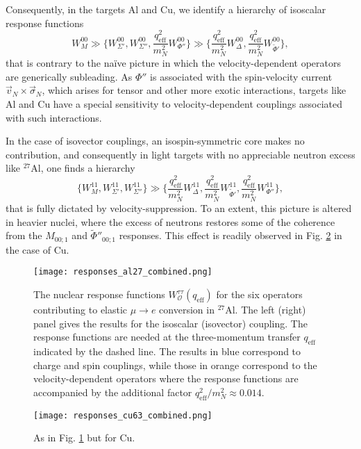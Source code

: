 \documentclass{book}[letterpaper,12pt]
\begin{document}
Consequently, in the targets Al and Cu, we identify a hierarchy of isoscalar response functions
\begin{equation}
W_M^{00}\gg \bigg\{W^{00}_{\Sigma'},W_{\Sigma''}^{00},\frac{q_\mathrm{eff}^2}{m_N^2}W^{00}_{\Phi''}\bigg\}\gg\bigg\{\frac{q_\mathrm{eff}^2}{m_N^2}W^{00}_{\Delta},\frac{q^2_\mathrm{eff}}{m_N^2}W_{\tilde{\Phi}'}^{00}\bigg\},
\end{equation}
that is contrary to the na\"ive picture in which the velocity-dependent operators are generically subleading. As $\Phi''$ is associated with the spin-velocity current $\vec{v}_N\times\vec{\sigma}_N$, which arises for tensor and other more exotic interactions, targets like Al and Cu have a special sensitivity to velocity-dependent couplings associated with such interactions. 

In the case of isovector couplings, an isospin-symmetric core makes no contribution, and consequently in light targets with no appreciable neutron excess like $^{27}$Al, one finds a hierarchy
\begin{equation}
\bigg\{W_M^{11},W^{11}_{\Sigma'},W_{\Sigma''}^{11}\bigg\}\gg\bigg\{\frac{q_\mathrm{eff}^2}{m_N^2}W^{11}_{\Delta},\frac{q^2_\mathrm{eff}}{m_N^2}W_{\tilde{\Phi}'}^{11},\frac{q^2_\mathrm{eff}}{m_N^2}W^{11}_{\Phi''}\bigg\},
\end{equation}
that is fully dictated by velocity-suppression. To an extent, this picture is altered in heavier nuclei, where the excess of neutrons restores some of the coherence from the $M_{00;1}$ and $\tilde{\Phi}''_{00;1}$ responses. This effect is readily observed in Fig. \ref{fig:Cu_responses} in the case of Cu.
\begin{figure}
\centering
\texttt{[image: responses\_al27\_combined.png]}
\caption{The nuclear response functions $W^{\tau\tau}_\mathcal{O}(q_\mathrm{eff})$ for the six operators contributing to elastic $\mu\rightarrow e$ conversion in $^{27}$Al. The left (right) panel gives the results for the isoscalar (isovector) coupling. The response functions are needed at the three-momentum transfer $q_\mathrm{eff}$ indicated by the dashed line. The results in blue correspond to charge and spin couplings, while those in orange correspond to the velocity-dependent operators where the response functions are accompanied by the additional factor $q^2_\mathrm{eff}/m_N^2\approx 0.014$.}
\label{fig:Al_responses}
\end{figure}
\begin{figure}
\centering
\texttt{[image: responses\_cu63\_combined.png]}
\caption{As in Fig. \ref{fig:Al_responses} but for Cu.}
\label{fig:Cu_responses}
\end{figure}
\end{document}
